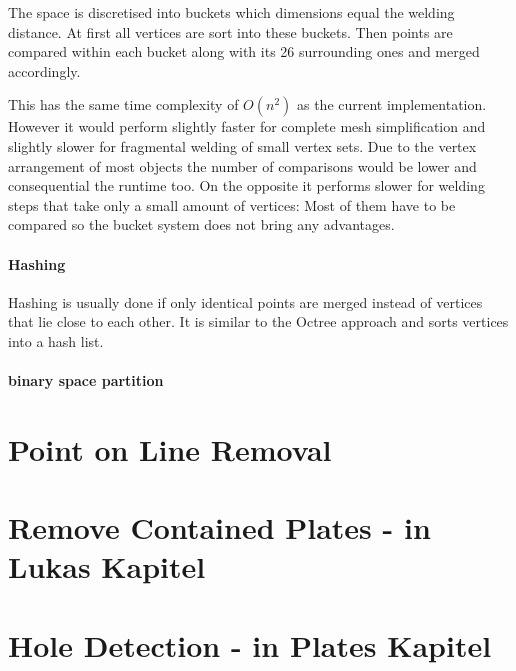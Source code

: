 \documentclass[../ClassicThesis.tex]{subfiles}
\begin{document}
The space is discretised into buckets which dimensions equal the welding distance. At first all vertices are sort into these buckets. Then points are compared within each bucket along with its 26 surrounding ones and merged accordingly.

This has the same time complexity of $O(n^2)$ as the current implementation. However it would perform slightly faster for complete mesh simplification and slightly slower for fragmental welding of small vertex sets. Due to the vertex arrangement of most objects the number of comparisons would be lower and consequential the runtime too. On the opposite it performs slower for welding steps that take only a small amount of vertices: Most of them have to be compared so the bucket system does not bring any advantages.

\paragraph{Hashing}

Hashing is usually done if only identical points are merged instead of vertices that lie close to each other. It is similar to the Octree approach and sorts vertices into a hash list. 

\paragraph{binary space partition}





\section{Point on Line Removal}

\section{Remove Contained Plates - in Lukas Kapitel}

\section{Hole Detection - in Plates Kapitel}
\end{document}
